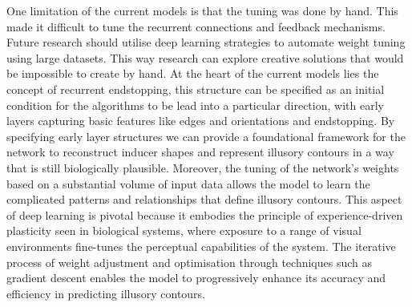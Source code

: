 \documentclass[12pt]{article}
\begin{document}
One limitation of the current models is that the tuning was done by hand. This made it difficult to tune the recurrent connections and feedback mechanisms. Future research should utilise deep learning strategies to automate weight tuning using large datasets. This way research can explore creative solutions that would be impossible to create by hand. At the heart of the current models lies the concept of recurrent endstopping, this structure can be specified as an initial condition for the algorithms to be lead into a particular direction, with early layers capturing basic features like edges and orientations and endstopping. By specifying early layer structures we can provide a foundational framework for the network to reconstruct inducer shapes and represent illusory contours in a way that is still biologically plausible. Moreover, the tuning of the network's weights based on a substantial volume of input data allows the model to learn the complicated patterns and relationships that define illusory contours. This aspect of deep learning is pivotal because it embodies the principle of experience-driven plasticity seen in biological systems, where exposure to a range of visual environments fine-tunes the perceptual capabilities of the system. The iterative process of weight adjustment and optimisation through techniques such as gradient descent enables the model to progressively enhance its accuracy and efficiency in predicting illusory contours.


\end{document}
